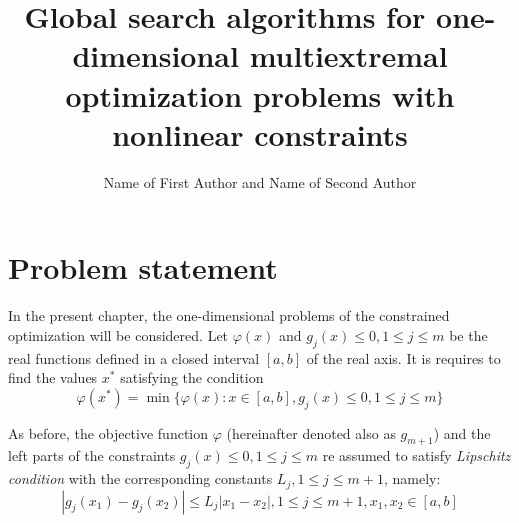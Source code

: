 \documentclass[graybox]{svmult}
\begin{document}
\title{Global search algorithms for one-dimensional multiextremal optimization problems with nonlinear constraints}
\author{Name of First Author and Name of Second Author}
%
%
\maketitle



\section{Problem statement}
In the present chapter, the one-dimensional problems of the constrained optimization will
be considered. Let $\varphi(x)$ and $g_j(x)\le 0,1\le j\le m$ be the real functions defined in a closed interval $[a,b]$ of the real axis. It is requires to find the values $x^*$ satisfying the condition
\begin{equation}
  \label{eq4:problem}
  \varphi(x^*)=\min\{\varphi(x):x\in [a,b], g_j(x)\le 0,1\le j\le m\}
\end{equation}

As before, the objective function $\varphi$ (hereinafter denoted also as $g_{m+1}$) and the left parts of the constraints $g_j(x)\le 0,1\le j\le m$ re assumed to satisfy \emph{Lipschitz condition} with the corresponding constants $L_j,1\le j\le m+1$, namely:
\begin{equation}
  |g_j(x_1)-g_j(x_2)|\le L_j|x_1-x_2|,1\le j\le m+1,x_1,x_2\in [a,b]
\end{equation}
\end{document}
